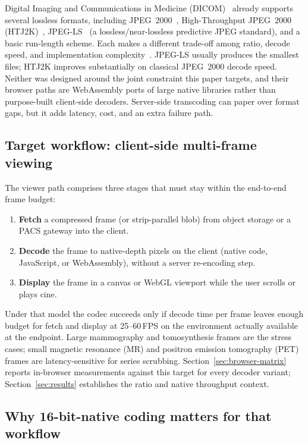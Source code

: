 \documentclass[journal]{IEEEtran}
\begin{document}
Digital Imaging and Communications in Medicine (DICOM)~\cite{dicom} already
supports several lossless formats, including JPEG~2000~\cite{taubman2002},
High-Throughput JPEG~2000 (HTJ2K)~\cite{htj2k2019}, JPEG-LS~\cite{loco1} (a
lossless/near-lossless predictive JPEG standard), and a basic run-length
scheme. Each makes a different trade-off among ratio, decode speed, and
implementation complexity~\cite{liu2017,clunie2000}. JPEG-LS usually produces
the smallest files; HTJ2K improves substantially on classical JPEG~2000 decode
speed. Neither was designed around the joint constraint this paper targets,
and their browser paths are WebAssembly ports of large native libraries
rather than purpose-built client-side decoders. Server-side transcoding can
paper over format gaps, but it adds latency, cost, and an extra failure path.

\subsection{Target workflow: client-side multi-frame viewing}
\label{sec:target-workflow}

The viewer path comprises three stages that must stay within the end-to-end
frame budget:

\begin{enumerate}
  \item \textbf{Fetch} a compressed frame (or strip-parallel blob) from object
  storage or a PACS gateway into the client.
  \item \textbf{Decode} the frame to native-depth pixels on the client
  (native code, JavaScript, or WebAssembly), without a server re-encoding
  step.
  \item \textbf{Display} the frame in a canvas or WebGL viewport while the
  user scrolls or plays cine.
\end{enumerate}

Under that model the codec succeeds only if decode time per frame leaves
enough budget for fetch and display at 25--60\,FPS on the environment actually
available at the endpoint. Large mammography and tomosynthesis frames are the
stress cases; small magnetic resonance (MR) and positron emission tomography
(PET) frames are latency-sensitive for series scrubbing.
Section~\ref{sec:browser-matrix} reports in-browser measurements against this
target for every decoder variant; Section~\ref{sec:results} establishes the
ratio and native throughput context.

\subsection{Why 16-bit-native coding matters for that workflow}
\end{document}
